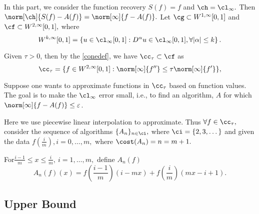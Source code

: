 
In this part, we consider the function recovery $S(f)=f$ and $\ch=\cl_{\infty}.$
Then $\norm[\ch]{S(f)-A(f)}=\norm[\infty]{f-A(f)}.$
Let $\cg \subset W^{1,\infty}[0,1]$ and $\cf \subset W^{2,\infty}[0,1],$ where
$$W^{k,\infty}[0,1]=\left\{u \in \cl_{\infty}[0,1]:D^\alpha u \in \cl_\infty[0,1], \forall |\alpha| \leq k \right\}.$$

Given $\tau>0$, then by the \eqref{conedef}, we have $\cc_{\tau} \subset \cf$ as
\begin{equation}\label{ctapprox}
\cc_{\tau}=\{f \in  W^{2,\infty}[0,1] : \norm[\infty]{f''}\leq \tau\norm[\infty]{f'}\},
\end{equation}

Suppose one wants to approximate functions in $\cc_{\tau}$ based on function values.  The goal is to make the $\cl_{\infty}$ error small, i.e., to find an algorithm, $A$ for which $\norm[\infty]{f-A(f)} \le \varepsilon$.

Here we use piecewise linear interpolation to approximate. Thus $\forall f \in \cc_{\tau},$ consider the sequence of algorithms $\{A_n\}_{n \in \ci},$ where
$\ci=\{2,3,\dots\}$
 and given the data $f\left(\frac{i}{m}\right), i=0, \ldots,m,$ where $\cost(A_{n})=n=m+1.$

For$\frac{i-1}{m} \leq x \leq \frac{i}{m}, \ i=1, \ldots, m,$ define $A_{n}(f)$
$$A_{n}(f)(x)=f\left(\frac{i-1}{m}\right)(i-mx)+f\left(\frac{i}{m}\right)(mx-i+1).$$


\subsection{Upper Bound}


